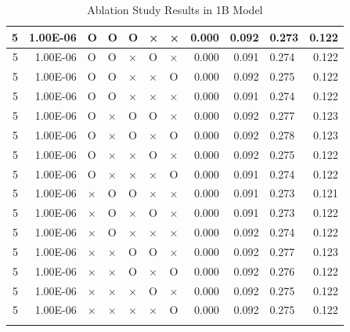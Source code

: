 \documentclass[11pt]{article}
\begin{document}
\begin{longtable}[h]{|r|r|l|l|l|l|l|r|r|l|r|}
5 & 1.00E-06 & O & O & O & × & × & 0.000 & 0.092 & 0.273 & 0.122 \\ \hline
5 & 1.00E-06 & O & O & × & O & × & 0.000 & 0.091 & 0.274 & 0.122 \\ \hline
5 & 1.00E-06 & O & O & × & × & O & 0.000 & 0.092 & 0.275 & 0.122 \\ \hline
5 & 1.00E-06 & O & O & × & × & × & 0.000 & 0.091 & 0.274 & 0.122 \\ \hline
5 & 1.00E-06 & O & × & O & O & × & 0.000 & 0.092 & 0.277 & 0.123 \\ \hline
5 & 1.00E-06 & O & × & O & × & O & 0.000 & 0.092 & 0.278 & 0.123 \\ \hline
5 & 1.00E-06 & O & × & × & O & × & 0.000 & 0.092 & 0.275 & 0.122 \\ \hline
5 & 1.00E-06 & O & × & × & × & O & 0.000 & 0.091 & 0.274 & 0.122 \\ \hline
5 & 1.00E-06 & × & O & O & × & × & 0.000 & 0.091 & 0.273 & 0.121 \\ \hline
5 & 1.00E-06 & × & O & × & O & × & 0.000 & 0.091 & 0.273 & 0.122 \\ \hline
5 & 1.00E-06 & × & O & × & × & × & 0.000 & 0.092 & 0.274 & 0.122 \\ \hline
5 & 1.00E-06 & × & × & O & O & × & 0.000 & 0.092 & 0.277 & 0.123 \\ \hline
5 & 1.00E-06 & × & × & O & × & O & 0.000 & 0.092 & 0.276 & 0.122 \\ \hline
5 & 1.00E-06 & × & × & × & O & × & 0.000 & 0.092 & 0.275 & 0.122 \\ \hline
5 & 1.00E-06 & × & × & × & × & O & 0.000 & 0.092 & 0.275 & 0.122 \\ \hline
\caption{Ablation Study Results in 1B Model}
\label{sec:tab_app_ablation}
\end{longtable}
\end{document}
